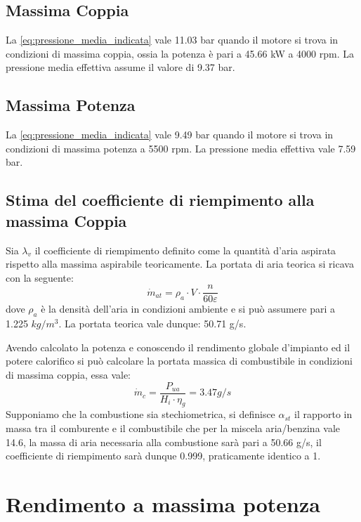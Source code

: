 \documentclass[a4paper,12pt]{article}
\begin{document}
\subsection{Massima Coppia}
La \eqref{eq:pressione_media_indicata} vale 11.03 bar quando il motore si trova in condizioni di massima coppia, ossia la potenza è pari a 45.66 kW a 4000 rpm.
La pressione media effettiva assume il valore di 9.37 bar.
\subsection{Massima Potenza}
La \eqref{eq:pressione_media_indicata} vale 9.49 bar quando il motore si trova in condizioni di massima potenza a 5500 rpm.
La pressione media effettiva vale 7.59 bar.

\subsection{Stima del coefficiente di riempimento alla massima Coppia}
Sia $\lambda_v$ il coefficiente di riempimento definito come la quantità d'aria aspirata rispetto alla massima aspirabile teoricamente.
La portata di aria teorica si ricava con la seguente:
\begin{equation}
    \dot m_{at} = \rho_a \cdot V \cdot \frac{n}{60\varepsilon}
\end{equation}
dove $\rho_a$ è la densità dell'aria in condizioni ambiente e si può assumere pari a 1.225 $kg/m^3$.
La portata teorica vale dunque: 50.71 g/s.

Avendo calcolato la potenza e conoscendo il rendimento globale d'impianto ed il potere calorifico si può calcolare la portata massica di combustibile in condizioni di massima
coppia, essa vale: 
\begin{equation}
    \dot m_c = \frac{P_{ua}}{H_i\cdot \eta_g} = 3.47 g/s
\end{equation}
Supponiamo che la combustione sia stechiometrica, si definisce $\alpha_{st}$ il rapporto in massa tra il comburente e il combustibile che per la miscela aria/benzina
vale 14.6, la massa di aria necessaria alla combustione sarà pari a 50.66 g/s, il coefficiente di riempimento sarà dunque 0.999, praticamente identico a 1.

\section{Rendimento a massima potenza}
\end{document}
